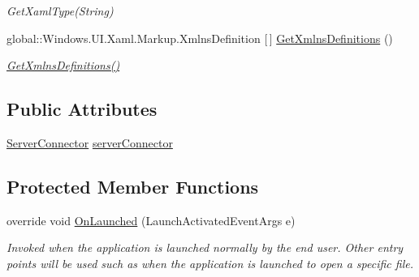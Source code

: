 \begin{DoxyCompactItemize}
\begin{DoxyCompactList}\small\item\em Get\+Xaml\+Type(\+String) \end{DoxyCompactList}\item 
global\+::\+Windows.\+U\+I.\+Xaml.\+Markup.\+Xmlns\+Definition \mbox{[}$\,$\mbox{]} \hyperlink{class_e_l_i_client_1_1_app_accf5e867fe29dd256be7c41a569315c6}{Get\+Xmlns\+Definitions} ()
\begin{DoxyCompactList}\small\item\em \hyperlink{class_e_l_i_client_1_1_app_accf5e867fe29dd256be7c41a569315c6}{Get\+Xmlns\+Definitions()} \end{DoxyCompactList}\end{DoxyCompactItemize}
\subsection*{Public Attributes}
\begin{DoxyCompactItemize}
\item 
\hyperlink{class_e_l_i_client_1_1_simple_e_l_i_server_communication_1_1_server_connector}{Server\+Connector} \hyperlink{class_e_l_i_client_1_1_app_a4d0f5e35517e7581b6d2a0e4504151b1}{server\+Connector}
\end{DoxyCompactItemize}
\subsection*{Protected Member Functions}
\begin{DoxyCompactItemize}
\item 
override void \hyperlink{class_e_l_i_client_1_1_app_a75f20ff688b0e8ab441fe87a23e8dbf0}{On\+Launched} (Launch\+Activated\+Event\+Args e)
\begin{DoxyCompactList}\small\item\em Invoked when the application is launched normally by the end user. Other entry points will be used such as when the application is launched to open a specific file. \end{DoxyCompactList}\end{DoxyCompactItemize}
